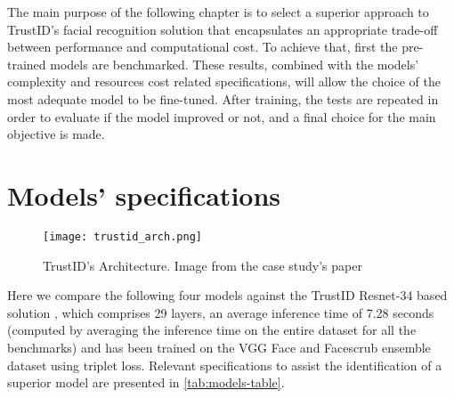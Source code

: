 \documentclass[class=report, crop=false, a4paper, 12pt]{standalone}
\begin{document}
The main purpose of the following chapter is to select a superior approach to TrustID's facial recognition solution that encapsulates an appropriate trade-off between performance and computational cost. To achieve that, first the pre-trained models are benchmarked. These results, combined with the models' complexity and resources cost related specifications, will allow the choice of the most adequate model to be fine-tuned. After training, the tests are repeated in order to evaluate if the model improved or not, and a final choice for the main objective is made.

\section{Models' specifications}

\begin{figure}[H]
    \centering
    \texttt{[image: trustid\_arch.png]}
    \caption[TrustID's Architecture.]{TrustID's Architecture. Image from the case study's paper~\autocite{fariaImagebasedFaceVerification2023}}
    \label{fig:trustid_arch}
  \end{figure}

\par Here we compare the following four models against the TrustID Resnet-34 based solution , which comprises 29 layers, an average inference time of 7.28 seconds (computed by averaging the inference time on the entire dataset for all the benchmarks) and has been trained on the VGG Face and Facescrub ensemble dataset using triplet loss. Relevant specifications to assist the identification of a superior model are presented in \autoref{tab:models-table}. 
\end{document}
